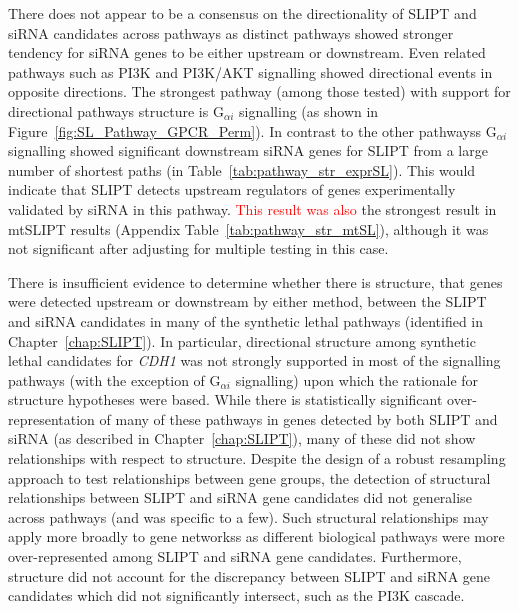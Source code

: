 There does not appear to be a consensus on the directionality of \gls{SLIPT} and \gls{siRNA} candidates across \glspl{pathway} as distinct \glspl{pathway} showed stronger tendency for \gls{siRNA} genes to be either upstream or downstream. Even related \glspl{pathway} such as PI3K and PI3K/AKT signalling showed directional events in opposite directions. The strongest \gls{pathway} (among those tested) with support for directional \glspl{pathway} structure is G$_{\alpha i}$ signalling (as shown in Figure~\ref{fig:SL_Pathway_GPCR_Perm}). In contrast to the other \glspl{pathway}s G$_{\alpha i}$ signalling showed significant downstream \gls{siRNA} genes for \gls{SLIPT} from a large number of \glspl{shortest path} (in Table~\ref{tab:pathway_str_exprSL}). This would indicate that \gls{SLIPT} detects upstream regulators of genes experimentally validated by \gls{siRNA} in this \gls{pathway}. \textcolor{red}{This result was also} the strongest result in \acrshort{mtSLIPT} results (Appendix Table~\ref{tab:pathway_str_mtSL}), although it was not significant after adjusting for multiple testing in this case. %


There is insufficient evidence to determine whether there is  structure, that genes were detected upstream or downstream by either method, between the \gls{SLIPT} and \gls{siRNA} candidates in many of the \gls{synthetic lethal} \glspl{pathway} (identified in Chapter~\ref{chap:SLIPT}). In particular, directional structure among \gls{synthetic lethal} candidates for \textit{CDH1} was not strongly supported in most of the signalling \glspl{pathway} (with the exception of G$_{\alpha i}$ signalling) upon which the rationale for  structure hypotheses were based. While there is statistically significant over-representation of many of these \glspl{pathway} in genes detected by both \gls{SLIPT} and \gls{siRNA} (as described in Chapter~\ref{chap:SLIPT}), many of these did not show relationships with respect to  structure. Despite the design of a robust resampling approach to test relationships between gene groups, the detection of structural relationships between \gls{SLIPT} and \gls{siRNA} gene candidates did not generalise across \glspl{pathway} (and was specific to a few). Such structural relationships may apply more broadly to gene networkss as different biological \glspl{pathway} were more over-represented among \gls{SLIPT} and \gls{siRNA} gene candidates. Furthermore,  structure did not account for the discrepancy between \gls{SLIPT} and \gls{siRNA} gene candidates which did not significantly intersect, such as the PI3K cascade. 

